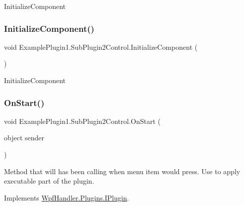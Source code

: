 Initialize\+Component 

\mbox{\label{class_example_plugin1_1_1_sub_plugin2_control_a9c58374e33843b9b7b75955801064f9b}} 
\subsubsection{\texorpdfstring{Initialize\+Component()}{InitializeComponent()}\hspace{0.1cm}{\footnotesize\ttfamily [5/5]}}
{\footnotesize\ttfamily void Example\+Plugin1.\+Sub\+Plugin2\+Control.\+Initialize\+Component (\begin{DoxyParamCaption}{ }\end{DoxyParamCaption})}



Initialize\+Component 

\mbox{\label{class_example_plugin1_1_1_sub_plugin2_control_ac44073957fa6c64503888c57d6d5d471}} 
\subsubsection{\texorpdfstring{On\+Start()}{OnStart()}\hspace{0.1cm}{\footnotesize\ttfamily [1/2]}}
{\footnotesize\ttfamily void Example\+Plugin1.\+Sub\+Plugin2\+Control.\+On\+Start (\begin{DoxyParamCaption}\item[{object}]{sender }\end{DoxyParamCaption})}



Method that will has been calling when menu item would press. Use to apply executable part of the plugin. 



Implements \mbox{\hyperlink{interface_wpf_handler_1_1_plugins_1_1_i_plugin_aabe1a8e5680ebeb37f96ffe86b6123e9}{Wpf\+Handler.\+Plugins.\+I\+Plugin}}.

